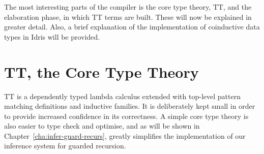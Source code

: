 
The most interesting parts of the compiler is the core type theory, TT, and the
elaboration phase, in which TT terms are built. These will now be explained in
greater detail. Also, a brief explanation of the implementation of coinductive
data types in Idris will be provided.

\section{TT, the Core Type Theory}
TT is a dependently typed lambda calculus extended with top-level pattern
matching definitions and inductive families. It is deliberately kept small in order to provide increased
confidence in its correctness. A simple core type theory is also easier to
type check and optimise, and as will be shown in
Chapter~\ref{cha:infer-guard-recurs}, greatly simplifies the implementation of
our inference system for guarded recursion.
